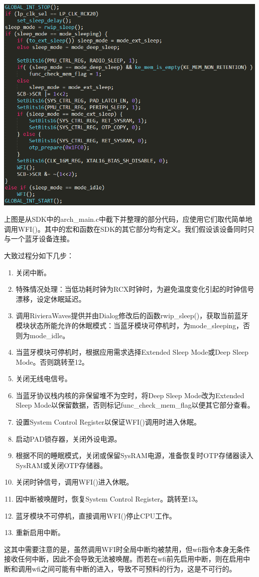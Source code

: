 \documentclass{ctexart}
\begin{document}
\centerline{\includegraphics[scale=0.55]{015}}\par
上图是从SDK中的arch\_main.c中截下并整理的部分代码，应使用它们取代简单地调用WFI()。其中的宏和函数在SDK的其它部分均有定义。我们假设该设备同时只与一个蓝牙设备连接。

大致过程分如下几步：
\begin{enumerate}
\item 关闭中断。
\item 特殊情况处理：当低功耗时钟为RCX时钟时，为避免温度变化引起的时钟信号漂移，设定休眠延迟。
\item 调用RivieraWaves提供并由Dialog修改后的函数rwip\_sleep()，获取当前蓝牙模块状态所能允许的休眠模式：当蓝牙模块可停机时，为mode\_sleeping，否则为mode\_idle。
\item 当蓝牙模块可停机时，根据应用需求选择Extended Sleep Mode或Deep Sleep Mode。否则跳转至12。
\item 关闭无线电信号。
\item 当蓝牙协议栈内核的非保留堆不为空时，将Deep Sleep Mode改为Extended Sleep Mode以保留数据，否则标记func\_check\_mem\_flag以便其它部分查看。
\item 设置System Control Register以保证WFI()调用时进入休眠。
\item 启动PAD锁存器，关闭外设电源。
\item 根据不同的睡眠模式，关闭或保留SysRAM电源，准备恢复时OTP存储器读入SysRAM或关闭OTP存储器。
\item 关闭时钟信号，调用WFI()进入休眠。
\item 因中断被唤醒时，恢复System Control Register。跳转至13。
\item 蓝牙模块不可停机，直接调用WFI()停止CPU工作。
\item 重新启用中断。
\end{enumerate}
这其中需要注意的是，虽然调用WFI时全局中断均被禁用，但wfi指令本身无条件接收任何中断，因此不会导致无法被唤醒。而若在wfi前先启用中断，则在启用中断和调用wfi之间可能有中断的进入，导致不可预料的行为，这是不可行的。
\end{document}
